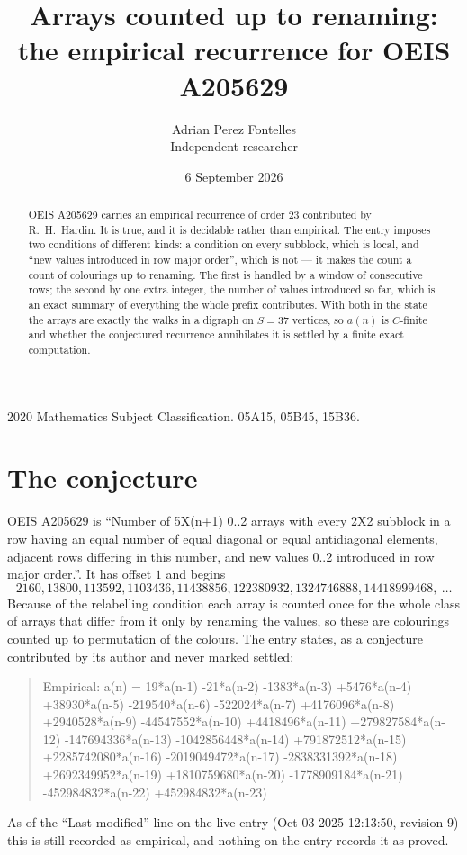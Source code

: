 \documentclass[11pt,a4paper]{article}
\title{Arrays counted up to renaming: the empirical recurrence for OEIS A205629}
\author{Adrian Perez Fontelles\\ \small Independent researcher}
\date{6 September 2026}
\theoremstyle{plain}
\theoremstyle{definition}
\begin{document}
\maketitle

\begin{abstract}
OEIS A205629 carries an empirical recurrence of order $23$ contributed by R.~H.~Hardin. It is
true, and it is decidable rather than empirical. The entry imposes two conditions of different
kinds: a condition on every subblock, which is local, and ``new values introduced in row major
order'', which is not --- it makes the count a count of colourings up to renaming. The first is
handled by a window of consecutive rows; the second by one extra integer, the number of values
introduced so far, which is an exact summary of everything the whole prefix contributes. With
both in the state the arrays are exactly the walks in a digraph on $S=37$ vertices, so $a(n)$
is $C$-finite and whether the conjectured recurrence annihilates it is settled by a finite
exact computation.
\end{abstract}

\noindent\small 2020 Mathematics Subject Classification. 05A15, 05B45, 15B36.\normalsize

\section{The conjecture}

OEIS A205629 is ``Number of 5X(n+1) 0..2 arrays with every 2X2 subblock in a row having an equal number of equal diagonal or equal antidiagonal elements, adjacent rows differing in this number, and new values 0..2 introduced in row major order.''. It has offset $1$ and begins
\[
2160, 13800, 113592, 1103436, 11438856, 122380932, 1324746888, 14418999468,\ \dots
\]
Because of the relabelling condition each array is counted once for the whole class of arrays that differ from it only by renaming the values, so these are colourings counted up to permutation of the colours.
The entry states, as a conjecture contributed by its author and never marked settled:
\begin{quote}
Empirical: a(n) = 19*a(n-1) -21*a(n-2) -1383*a(n-3) +5476*a(n-4) +38930*a(n-5) -219540*a(n-6) -522024*a(n-7) +4176096*a(n-8) +2940528*a(n-9) -44547552*a(n-10) +4418496*a(n-11) +279827584*a(n-12) -147694336*a(n-13) -1042856448*a(n-14) +791872512*a(n-15) +2285742080*a(n-16) -2019049472*a(n-17) -2838331392*a(n-18) +2692349952*a(n-19) +1810759680*a(n-20) -1778909184*a(n-21) -452984832*a(n-22) +452984832*a(n-23)
\end{quote}
As of the ``Last modified'' line on the live entry (Oct 03 2025 12:13:50, revision 9) this is still
recorded as empirical, and nothing on the entry records it as proved.
\end{document}
